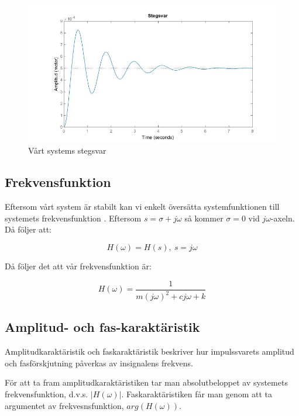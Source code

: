 \documentclass[10pt,a4paper]{article}
\begin{document}
\begin{figure}
\begin{center}
\includegraphics[scale=0.5]{Stegsvar}
\caption{Vårt systems stegsvar}
\end{center}
\end{figure}

\subsection{Frekvensfunktion}
Eftersom vårt system är stabilt kan vi enkelt översätta systemfunktionen till systemets frekvensfunktion \cite[s.~130]{sune2000}. Eftersom $s = \sigma + j\omega$ så kommer $\sigma = 0$ vid $j\omega$-axeln. Då följer att:

\begin{equation}
H(\omega) = H(s), \  s = j\omega
\end{equation}

Då följer det att vår frekvensfunktion är:

\begin{equation}
H(\omega) =  \frac{1}{m (j\omega)^2 + c  j\omega + k}
\end{equation}

\newpage
\subsection{Amplitud- och fas-karaktäristik}

Amplitudkaraktäristik och faskaraktäristik beskriver hur impulssvarets amplitud och fasförskjutning påverkas av insignalens frekvens.

För att ta fram amplitudkaraktäristiken tar man absolutbeloppet av systemets frekvensfunktion, d.v.s. $|H(\omega)|$. Faskaraktäristiken får man genom att ta argumentet av frekvesnsfunktion, $arg(H(\omega))$\cite[s.~130]{sune2000}. 
\end{document}
